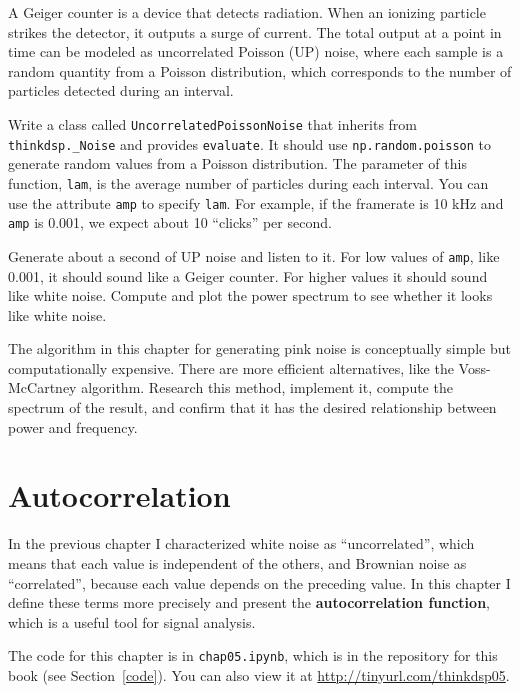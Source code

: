 \documentclass[12pt]{book}
\begin{document}
\begin{exercise}
A Geiger counter is a device that detects radiation.
When an ionizing particle strikes the detector, it outputs a surge of
current.  The total output at a point in time can be modeled as 
uncorrelated Poisson (UP) noise, where each sample is
a random quantity from a Poisson distribution, which corresponds to the
number of particles detected during an interval.

Write a class called {\tt UncorrelatedPoissonNoise} that inherits
from \verb"thinkdsp._Noise" and provides {\tt evaluate}.  It should
use {\tt np.random.poisson} to generate random values from a Poisson
distribution.  The parameter of this function, {\tt lam}, is the
average number of particles during each interval.  You can use the
attribute {\tt amp} to specify {\tt lam}.  For example, if the
framerate is 10 kHz and {\tt amp} is 0.001, we expect about 10
``clicks'' per second.

Generate about a second of UP noise and listen to it.  For low values
of {\tt amp}, like 0.001, it should sound like a Geiger counter.  For
higher values it should sound like white noise.  Compute and plot the
power spectrum to see whether it looks like white noise.
\end{exercise}


\begin{exercise}
The algorithm in this chapter for generating pink noise is
conceptually simple but computationally expensive.  There are
more efficient alternatives, like the Voss-McCartney algorithm.
Research this method, implement it, compute the spectrum of
the result, and confirm that it has the desired relationship
between power and frequency.
\end{exercise}


\chapter{Autocorrelation}

In the previous chapter I characterized white noise as ``uncorrelated'',
which means that each value is independent of the others, and Brownian
noise as ``correlated'', because each value depends on the preceding
value.  In this chapter I define these terms more precisely and
present the {\bf autocorrelation function}, which is a useful tool
for signal analysis.

The code for this chapter is in {\tt chap05.ipynb}, which is in the
repository for this book (see Section~\ref{code}).
You can also view it at \url{http://tinyurl.com/thinkdsp05}.
\end{document}
